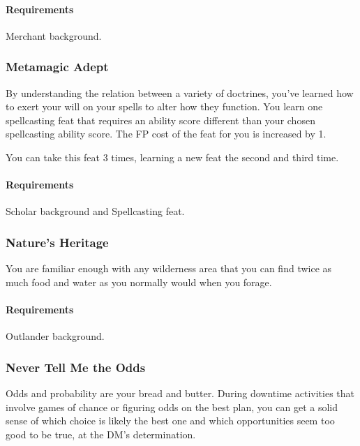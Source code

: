    \paragraph{Requirements} Merchant background.
\subsubsection{Metamagic Adept} \label{feat::metamagicadept}
    By understanding the relation between a variety of doctrines, you've learned how to exert your will on your spells to alter how they function.
    You learn one spellcasting feat that requires an ability score different than your chosen spellcasting ability score.
    The FP cost of the feat for you is increased by 1.

    You can take this feat 3 times, learning a new feat the second and third time.
    \paragraph{Requirements} Scholar background and Spellcasting feat.
\subsubsection{Nature's Heritage} \label{feat::naturesheritage}
    You are familiar enough with any wilderness area that you can find twice as much food and water as you normally would when you forage.
    \paragraph{Requirements} Outlander background.
\subsubsection{Never Tell Me the Odds} \label{feat::nevertellmetheodds}
    Odds and probability are your bread and butter.
    During downtime activities that involve games of chance or figuring odds on the best plan, you can get a solid sense of which choice is likely the best one and which opportunities seem too good to be true, at the DM's determination.
